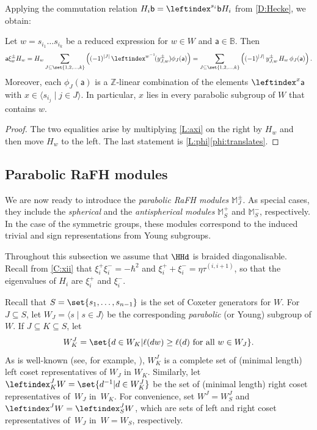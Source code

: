 \documentclass[a4paper,11pt]{amsart}
\let\<\langle
\let\>\rangle
\numberwithin{equation}{subsection}
\theoremstyle{definition}
\theoremstyle{theorem}
\theoremstyle{remark}
\newcommand\MJ{\mathbb{M}}
\newcommand\Sym{W}
\newcommand\ba{\mathsf{a}}
\newcommand\bb{\mathsf{b}}
\newcommand\taui[1][i]{\tau^{(#1)}}
\newcommand\Z{\mathbb{Z}}
\newcommand{\Bo}{\mathbb{B}}
\begin{document}
Applying the commutation relation $H_i\bb=\leftindex^{s_i}\bb H_i$ from  \autoref{D:Hecke}, we obtain:

 \begin{Corollary}\label{C:axiH}
   Let $w=s_{i_1}\dots s_{i_k}$ be a reduced expression for $w\in\Sym$ and $\ba\in\Bo$. Then
   \[
     \ba\xi^\pm_wH_w = H_w\sum_{J\subseteq\set{1,2,\dots,k}}\left(
     (-1)^{|J|}\,\leftindex^{w^{-1}}{{\!(y^\pm_{J,w})}}\phi_J(\ba) \right)
     = \sum_{J\subseteq\set{1,2,\dots,k}}
    \left( (-1)^{|J|}\,y^\pm_{J,w}\,H_w\,\phi_J(\ba)\right).
   \]
   Moreover, each $\phi_J(\ba)$ is a $\Z$-linear combination of the elements
   $\leftindex^x\ba$ with $x\in\langle s_{i_j}\mid j\in J\rangle$. In particular, $x$ lies in every
   parabolic subgroup of $\Sym$ that contains $w$.
 \end{Corollary}

 \begin{proof}
   The two equalities arise by multiplying \autoref{L:axi} on the right by $H_w$ and then move $H_w$ to the left.
   The last statement is \autoref{L:phi}\ref{phi:translates}.
 \end{proof}

\subsection{Parabolic RaFH modules}

We are now ready to introduce the \emph{parabolic RaFH modules}
$\MJ^\pm_J$. As special cases, they include the \emph{spherical} and the
\emph{antispherical modules} $\MJ^+_S$ and  $\MJ^-_S$, respectively. In
the case of the symmetric groups, these modules correspond to
the induced trivial and sign representations from Young subgroups.

Throughout this subsection we assume that $\HHd$ is braided diagonalisable. Recall from
\autoref{C:xii} that $\xi^+_i\xi^-_i=-\hbar^2$ and
$\xi^+_i+\xi^-_i=\eta\taui[i,i+1]$, so that the eigenvalues of $H_i$ are
$\xi^+_i$ and $\xi^-_i$.


Recall that $S=\set{s_1,\dots,s_{n-1}}$ is the set of Coxeter generators
for $W$. For $J\subseteq S$, let $\Sym_J=\<s\mid s\in J\>$ be the corresponding
\emph{parabolic} (or Young) subgroup of $W$. If $J\subseteq K\subseteq
S$, let
\[
 \Sym_K^J = \set{d\in\Sym_K|\ell(dw)\ge\ell(d)\text{ for all }w\in\Sym_J}.
\]
As is well-known (see, for example,
\cite[Proposition~3.3]{Mathas:ULect}), $\Sym^J_K$ is a complete set of
(minimal length) left coset representatives of $\Sym_J$ in $\Sym_K$.
Similarly, let $\leftindex^J_K W=\set{d^{-1}|d\in\Sym^J_K}$ be the set
of (minimal length) right coset representatives of~$\Sym_J$ in~$\Sym_K$. For
convenience, set $\Sym^J=\Sym^J_S$ and $\leftindex^J W=\leftindex^J_S W$,
which are sets of left and right coset representatives of~$\Sym_J$ in~$W=\Sym_S$,
respectively.
\end{document}

